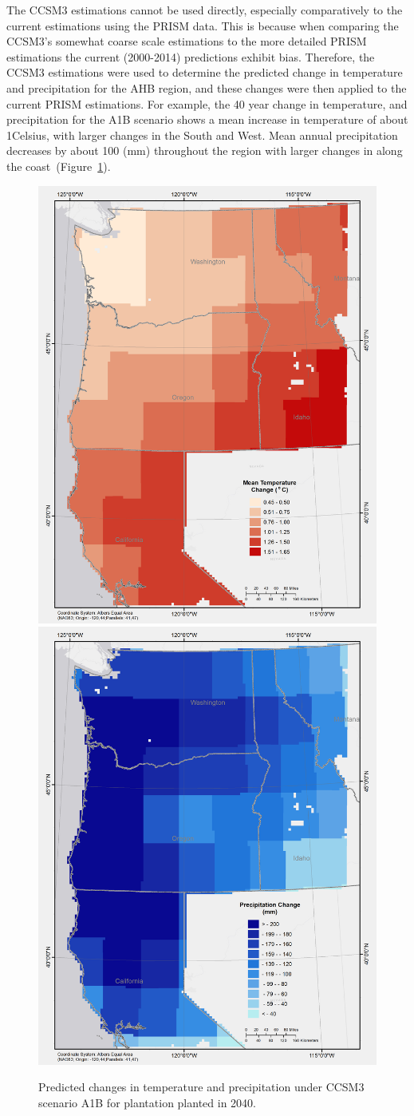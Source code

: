 \documentclass[preprint,12pt]{elsarticle}
\begin{document}
The \ac{CCSM3} estimations cannot be used directly, especially
comparatively to the current estimations using the \ac{PRISM} data.
This is because when comparing the \ac{CCSM3}'s somewhat coarse scale
estimations to the more detailed \ac{PRISM} estimations the current
(2000-2014) predictions exhibit bias.  Therefore, the \ac{CCSM3}
estimations were used to determine the predicted change in temperature
and precipitation for the \ac {AHB} region, and these changes were
then applied to the current \ac{PRISM} estimations. For example, the
40 year change in temperature, and precipitation for the A1B scenario
shows a mean increase in temperature of about 1\degree Celsius, with
larger changes in the South and West.  Mean annual precipitation
decreases by about 100 (mm) throughout the region with larger changes
in along the coast~(Figure~\ref{fig:change}).

\begin{figure}[hp]
  \centering
  \includegraphics[width=0.45\linewidth]{temp_change}
  \includegraphics[width=0.45\linewidth]{precip_change.png}
  \caption{Predicted changes in temperature and precipitation under \ac{CCSM3} scenario A1B for plantation planted in 2040.}
  \label{fig:change}
\end{figure}
\end{document}
